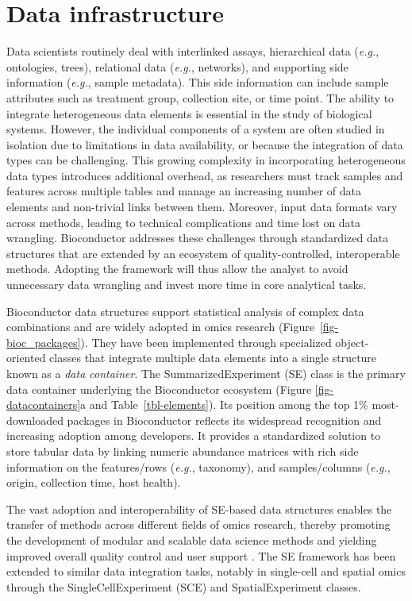 \documentclass[
  sn-nature,
]{sn-jnl}
\begin{document}
\section{Data infrastructure}\label{sec-infra}

Data scientists routinely deal with interlinked assays, hierarchical
data (\emph{e.g.}, ontologies, trees), relational data (\emph{e.g.},
networks), and supporting side information (\emph{e.g.}, sample
metadata). This side information can include sample attributes such as
treatment group, collection site, or time point. The ability to
integrate heterogeneous data elements is essential in the study of
biological systems. However, the individual components of a system are
often studied in isolation due to limitations in data availability, or
because the integration of data types can be challenging. This growing
complexity in incorporating heterogeneous data types introduces
additional overhead, as researchers must track samples and features
across multiple tables and manage an increasing number of data elements
and non-trivial links between them. Moreover, input data formats vary
across methods, leading to technical complications and time lost on data
wrangling. Bioconductor addresses these challenges through standardized
data structures that are extended by an ecosystem of quality-controlled,
interoperable methods. Adopting the framework will thus allow the
analyst to avoid unnecessary data wrangling and invest more time in core
analytical tasks.

Bioconductor data structures support statistical analysis of complex
data combinations \citep{huber2015} and are widely adopted in omics
research (Figure~\ref{fig-bioc_packages}). They have been implemented
through specialized object-oriented classes that integrate multiple data
elements into a single structure known as a \emph{data container}. The
SummarizedExperiment (SE) class \citep{huber2015} is the primary data
container underlying the Bioconductor ecosystem (Figure
\ref{fig-datacontainers}a and Table~\ref{tbl-elements}). Its position
among the top 1\% most-downloaded packages in Bioconductor reflects its
widespread recognition and increasing adoption among developers. It
provides a standardized solution to store tabular data by linking
numeric abundance matrices with rich side information on the
features/rows (\emph{e.g.}, taxonomy), and samples/columns (\emph{e.g.},
origin, collection time, host health).

The vast adoption and interoperability of SE-based data structures
enables the transfer of methods across different fields of omics
research, thereby promoting the development of modular and scalable data
science methods and yielding improved overall quality control and user
support \citep{drnevich2025}. The SE framework has been extended to
similar data integration tasks, notably in single-cell and spatial omics
through the SingleCellExperiment (SCE) \citep{amezquita2020} and
SpatialExperiment \citep{righelli2022} classes.
\end{document}
